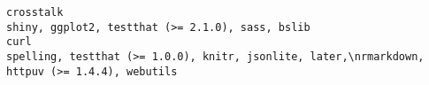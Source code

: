\documentclass[
  letterpaper,
  DIV=11,
  numbers=noendperiod]{scrreprt}
\begin{document}
\begin{verbatim}
crosstalk                                                                                                                                                                                                                                                                                                                                                                                                                                                                                                                                                                                                                                                                                                                                                                                                                                                                                                                                                                                                                                                                                                                                                                                                                                                    shiny, ggplot2, testthat (>= 2.1.0), sass, bslib
curl                                                                                                                                                                                                                                                                                                                                                                                                                                                                                                                                                                                                                                                                                                                                                                                                                                                                                                                                                                                                                                                                                                                                                                                                           spelling, testthat (>= 1.0.0), knitr, jsonlite, later,\nrmarkdown, httpuv (>= 1.4.4), webutils

\end{verbatim}
\end{document}
